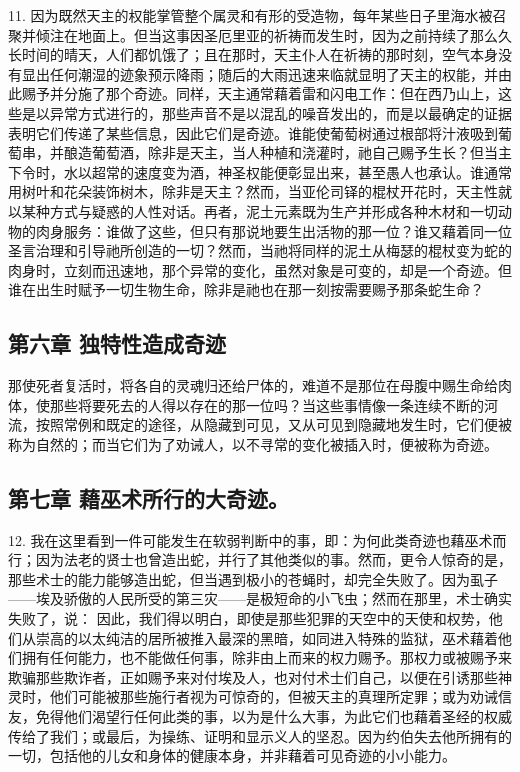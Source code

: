 11. 因为既然天主的权能掌管整个属灵和有形的受造物，每年某些日子里海水被召聚并倾注在地面上。但当这事因圣厄里亚的祈祷而发生时，因为之前持续了那么久长时间的晴天，人们都饥饿了；且在那时，天主仆人在祈祷的那时刻，空气本身没有显出任何潮湿的迹象预示降雨；随后的大雨迅速来临就显明了天主的权能，并由此赐予并分施了那个奇迹。同样，天主通常藉着雷和闪电工作：但在西乃山上，这些是以异常方式进行的，那些声音不是以混乱的噪音发出的，而是以最确定的证据表明它们传递了某些信息，因此它们是奇迹。谁能使葡萄树通过根部将汁液吸到葡萄串，并酿造葡萄酒，除非是天主，当人种植和浇灌时，祂自己赐予生长？但当主下令时，水以超常的速度变为酒，神圣权能便彰显出来，甚至愚人也承认。谁通常用树叶和花朵装饰树木，除非是天主？然而，当亚伦司铎的棍杖开花时，天主性就以某种方式与疑惑的人性对话。再者，泥土元素既为生产并形成各种木材和一切动物的肉身服务：谁做了这些，但只有那说地要生出活物的那一位？谁又藉着同一位圣言治理和引导祂所创造的一切？然而，当祂将同样的泥土从梅瑟的棍杖变为蛇的肉身时，立刻而迅速地，那个异常的变化，虽然对象是可变的，却是一个奇迹。但谁在出生时赋予一切生物生命，除非是祂也在那一刻按需要赐予那条蛇生命？\par


\subsection{第六章 独特性造成奇迹}

那使死者复活时，将各自的灵魂归还给尸体的，难道不是那位在母腹中赐生命给肉体，使那些将要死去的人得以存在的那一位吗？当这些事情像一条连续不断的河流，按照常例和既定的途径，从隐藏到可见，又从可见到隐藏地发生时，它们便被称为自然的；而当它们为了劝诫人，以不寻常的变化被插入时，便被称为奇迹。\par


\subsection{第七章  藉巫术所行的大奇迹。}

12. 我在这里看到一件可能发生在软弱判断中的事，即：为何此类奇迹也藉巫术而行；因为法老的贤士也曾造出蛇，并行了其他类似的事。然而，更令人惊奇的是，那些术士的能力能够造出蛇，但当遇到极小的苍蝇时，却完全失败了。因为虱子——埃及骄傲的人民所受的第三灾——是极短命的小飞虫；然而在那里，术士确实失败了，说： 因此，我们得以明白，即使是那些犯罪的天空中的天使和权势，他们从崇高的以太纯洁的居所被推入最深的黑暗，如同进入特殊的监狱，巫术藉着他们拥有任何能力，也不能做任何事，除非由上而来的权力赐予。那权力或被赐予来欺骗那些欺诈者，正如赐予来对付埃及人，也对付术士们自己，以便在引诱那些神灵时，他们可能被那些施行者视为可惊奇的，但被天主的真理所定罪；或为劝诫信友，免得他们渴望行任何此类的事，以为是什么大事，为此它们也藉着圣经的权威传给了我们；或最后，为操练、证明和显示义人的坚忍。因为约伯失去他所拥有的一切，包括他的儿女和身体的健康本身，并非藉着可见奇迹的小小能力。\par

